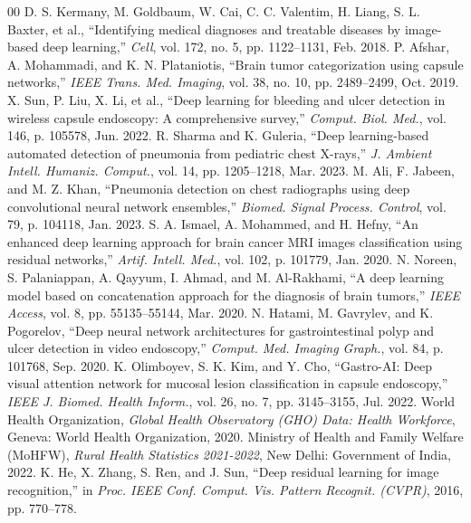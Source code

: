 \documentclass[conference]{IEEEtran}
\begin{document}
\begin{thebibliography}{00}
 D. S. Kermany, M. Goldbaum, W. Cai, C. C. Valentim, H. Liang, S. L. Baxter, et al., ``Identifying medical diagnoses and treatable diseases by image-based deep learning,'' \emph{Cell}, vol. 172, no. 5, pp. 1122--1131, Feb. 2018.
 P. Afshar, A. Mohammadi, and K. N. Plataniotis, ``Brain tumor categorization using capsule networks,'' \emph{IEEE Trans. Med. Imaging}, vol. 38, no. 10, pp. 2489--2499, Oct. 2019.
 X. Sun, P. Liu, X. Li, et al., ``Deep learning for bleeding and ulcer detection in wireless capsule endoscopy: A comprehensive survey,'' \emph{Comput. Biol. Med.}, vol. 146, p. 105578, Jun. 2022.
 R. Sharma and K. Guleria, ``Deep learning-based automated detection of pneumonia from pediatric chest X-rays,'' \emph{J. Ambient Intell. Humaniz. Comput.}, vol. 14, pp. 1205--1218, Mar. 2023.
 M. Ali, F. Jabeen, and M. Z. Khan, ``Pneumonia detection on chest radiographs using deep convolutional neural network ensembles,'' \emph{Biomed. Signal Process. Control}, vol. 79, p. 104118, Jan. 2023.
 S. A. Ismael, A. Mohammed, and H. Hefny, ``An enhanced deep learning approach for brain cancer MRI images classification using residual networks,'' \emph{Artif. Intell. Med.}, vol. 102, p. 101779, Jan. 2020.
 N. Noreen, S. Palaniappan, A. Qayyum, I. Ahmad, and M. Al-Rakhami, ``A deep learning model based on concatenation approach for the diagnosis of brain tumors,'' \emph{IEEE Access}, vol. 8, pp. 55135--55144, Mar. 2020.
 N. Hatami, M. Gavrylev, and K. Pogorelov, ``Deep neural network architectures for gastrointestinal polyp and ulcer detection in video endoscopy,'' \emph{Comput. Med. Imaging Graph.}, vol. 84, p. 101768, Sep. 2020.
 K. Olimboyev, S. K. Kim, and Y. Cho, ``Gastro-AI: Deep visual attention network for mucosal lesion classification in capsule endoscopy,'' \emph{IEEE J. Biomed. Health Inform.}, vol. 26, no. 7, pp. 3145--3155, Jul. 2022.
 World Health Organization, \emph{Global Health Observatory (GHO) Data: Health Workforce}, Geneva: World Health Organization, 2020.
 Ministry of Health and Family Welfare (MoHFW), \emph{Rural Health Statistics 2021-2022}, New Delhi: Government of India, 2022.
 K. He, X. Zhang, S. Ren, and J. Sun, ``Deep residual learning for image recognition,'' in \emph{Proc. IEEE Conf. Comput. Vis. Pattern Recognit. (CVPR)}, 2016, pp. 770--778.

\end{thebibliography}
\end{document}
